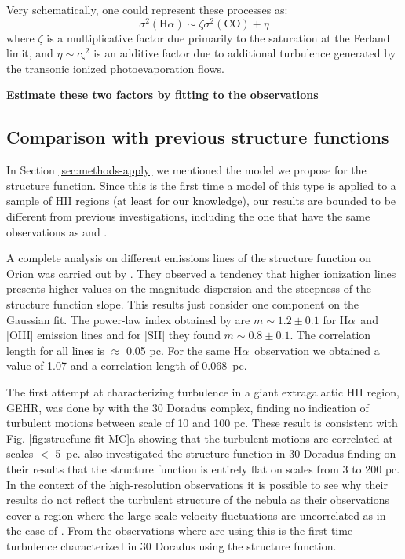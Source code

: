 \documentclass[fleqn,usenatbib, useAMS, a4paper]{mnras}
\newcommand\halpha{H${\alpha}$}
\newcommand\ha{\ensuremath{\text{H}\alpha}}
\newcommand*\chem[1]{\ensuremath{\mathrm{#1}}}
\newcommand\csound{\ensuremath{c_{\text{s}}}}
\begin{document}
Very schematically, one could represent these processes as:
\begin{equation}
  \label{eq:1}
  \sigma^2(\ha) \sim \zeta \sigma^2(\chem{CO}) + \eta
\end{equation}
where \(\zeta\) is a multiplicative factor
due primarily to the saturation at the Ferland limit,
and \(\eta \sim \csound^2\) is an additive factor due to additional turbulence
generated by the transonic ionized photoevaporation flows.

\textbf{Estimate these two factors by fitting to the observations}

\subsection{Comparison with previous structure functions}

In Section \ref{sec:methods-apply} we mentioned the model we propose for the structure function.
Since this is the first time a model of this type is applied to a sample of HII regions (at least for our knowledge), our results are bounded to be different from previous investigations, including the one that have the same observations as \citet{arthur2016turbulence} and \citet{Medina-Tanco:1997a,Melnick:2021x}. 

A complete analysis on different emissions lines of the structure function on Orion was carried out by \citet{arthur2016turbulence}. 
They observed a tendency that higher ionization lines presents higher values on the magnitude dispersion and the steepness of the structure function slope. 
This results just consider one component on the Gaussian fit. 
The power-law index obtained by \citet{arthur2016turbulence} are \(m \sim 1.2 \pm 0.1\) for \halpha\ and [OIII] emission lines and for [SII] they found \(m \sim 0.8 \pm 0.1\). 
The correlation length for all lines is \(\approx\) 0.05 pc. For the same \halpha\ observation we obtained a value of \num{1.07} and a correlation length of \SI{0.068}{pc}. 

The first attempt at characterizing turbulence in a giant extragalactic HII region, GEHR, was done by \citet{1961MNRAS.122....1F} with the 30 Doradus complex, finding no indication of turbulent motions between scale of 10 and 100 pc.
These result is consistent with Fig. \ref{fig:strucfunc-fit-MC}a showing that the turbulent motions are correlated at scales \(<\) \SI{5}{pc}.
\citet{Melnick:2021x} also investigated the structure function in 30 Doradus finding on their results that the structure function is entirely flat on scales from 3 to 200 pc.
In the context of the high-resolution observations it is possible to see why their results do not reflect the turbulent structure of the nebula as their observations cover a region where the large-scale velocity fluctuations are uncorrelated as in the case of \citet{1961MNRAS.122....1F}.
From the observations where are using this is the first time turbulence characterized in 30 Doradus using the structure function.
\end{document}
